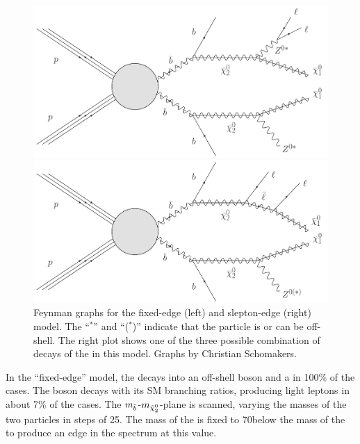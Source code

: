 \begin{figure}[htbp]
\centering
\begin{minipage}[t]{0.49\textwidth}
  \includegraphics[width=\textwidth]{plots/THEO/Feynman_graph_T6bblledgeZ.pdf}
\end{minipage}
\begin{minipage}[t]{0.49\textwidth}
\includegraphics[width=\textwidth]{plots/THEO/Feynman_graph_T6bbslepton.pdf}
\end{minipage}
\caption{Feynman graphs for the fixed-edge (left) and slepton-edge (right) model. The ``$^{*}$'' and ``($^{*}$)'' indicate that the particle is or can be off-shell. The right plot shows one of the three possible combination of decays of the \secondchi in this model. Graphs by Christian Schomakers.}
\label{fig:sigFeyn}
\end{figure}

In the ``fixed-edge'' model, the \secondchi decays into an off-shell \Z boson and a \firstchi in 100\% of the cases. The \Z boson decays with its SM branching ratios, producing light leptons in about 7\% of the cases. The $m_{\tilde{b}}$-$m_{{\tilde{\chi}^0_2}}$-plane is scanned, varying the masses of the two particles in steps of 25\GeV. The mass of the \firstchi is fixed to 70\GeV below the mass of the \secondchi to produce an edge in the \mll spectrum at this value.

